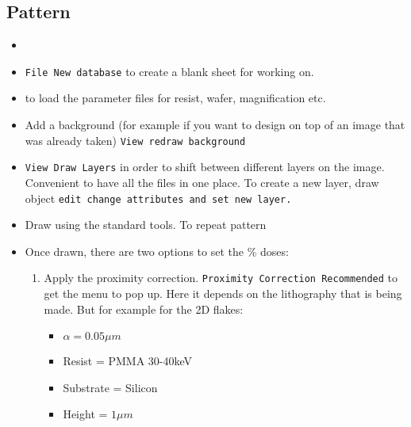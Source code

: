 \subsection{Pattern}
 \begin{itemize}
 \item  {}
 \item \texttt{File  \ira New  database} to create  a blank  sheet for
   working on.
 \item {}  to load the
   parameter  files for  resist, wafer,  magnification etc.  
 \item Add a background  (for example if you want to  design on top of
   an  image that  was already  taken) \texttt{View  \ira redraw  \ira
     background}
 \item  \texttt{View  \ira Draw  Layers}  in  order to  shift  between
   different layers on the image. Convenient  to have all the files in
   one place.  To create  a new layer,  draw object  \texttt{edit \ira
     change attributes and set new layer.}
 \item Draw using the standard tools.  To repeat pattern 
 \item Once drawn, there are two options to set the \% doses:
   \begin{enumerate}
   \item  Apply  the   proximity  correction.  \texttt{Proximity  \ira
       Correction \ira Recommended} to get the menu to pop up. Here it
     depends on  the lithography that  is being made. But  for example
     for the 2D flakes:
     \begin{itemize}
     \item $\alpha=0.05\mu m$
     \item Resist = PMMA 30-40keV
     \item Substrate = Silicon
     \item  Height =  $1\mu m$  

\end{itemize}
\end{enumerate}
\end{itemize}
